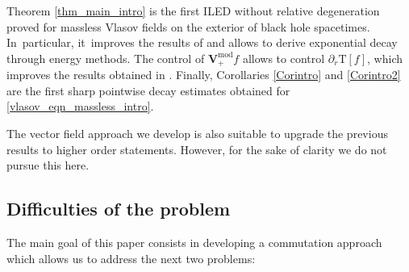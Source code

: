 \documentclass[10pt]{amsart}
\theoremstyle{plain}
\theoremstyle{definition}
\begin{document}
Theorem \ref{thm_main_intro} is the first ILED without relative degeneration proved for massless Vlasov fields on the exterior of black hole spacetimes. In~particular, it~improves the results of \cite{ABJ, L23} and allows to derive exponential decay through energy methods. The control of $\pmb{V}_+^{\mathrm{mod}} f$ allows to control $\partial_r \mathrm{T}[f]$, which improves the results obtained in \cite{ABJ, L23, W23}. Finally, Corollaries \ref{Corintro} and \ref{Corintro2} are the first sharp pointwise decay estimates obtained for \eqref{vlasov_eqn_massless_intro}.

The vector field approach we develop is also suitable to upgrade the previous results to higher order statements. However, for the sake of clarity we do not pursue this here.

\subsection{Difficulties of the problem}
The main goal of this paper consists in developing a commutation approach which allows us to address the next two problems:
\end{document}
